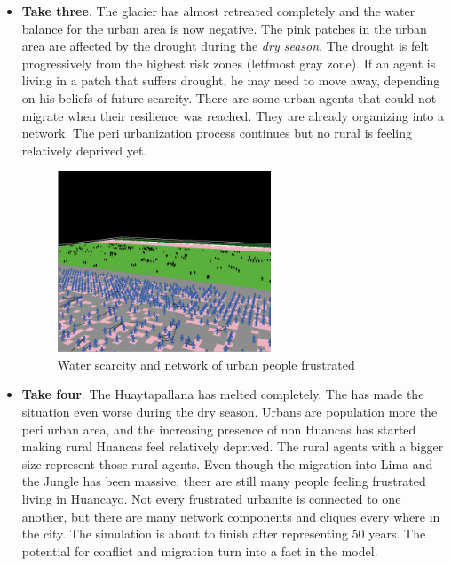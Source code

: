 \documentclass{article}
\begin{document}
\begin{itemize}
\item {\bf Take three}. The glacier has almost retreated completely and the water balance for the urban area is now negative. The pink patches in the urban area are affected by the drought during the \emph{dry season}. The drought is felt progressively from the highest risk zones (letfmost gray zone).  If an agent is living in a patch that suffers drought, he may need to move away, depending on his beliefs of future scarcity. There are some urban agents that could not migrate when their resilience was reached. They are already organizing into a network. The peri urbanization process continues but no rural is feeling relatively deprived yet.

\begin{figure}[h]
  \centering
  \includegraphics[width=0.6\textwidth]{esc3}
  \caption{Water scarcity and network of urban people frustrated}
  \label{esc3}
\end{figure}

\item {\bf Take four}. The Huaytapallana has melted completely. The has made the situation even worse during the dry season. Urbans are population more the peri urban area, and the increasing presence of non Huancas has started making rural Huancas feel relatively deprived. The rural agents with a bigger size represent those rural agents. Even though the migration into Lima and the Jungle has been massive, theer are still many people feeling frustrated living in Huancayo. Not every frustrated urbanite is connected to one another, but there are many network components and cliques every where in the city. The simulation is about to finish after representing 50 years. The potential for conflict and migration turn into a fact in the model.


\end{itemize}
\end{document}
